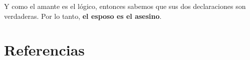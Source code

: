 \documentclass[letterpaper,11pt]{article}
\begin{document}
    Y como el amante es el lógico, entonces sabemos que sus dos declaraciones
    son verdaderas. Por lo tanto, \textbf{el esposo es el asesino}.

    \section{Referencias}
    
\end{document}
